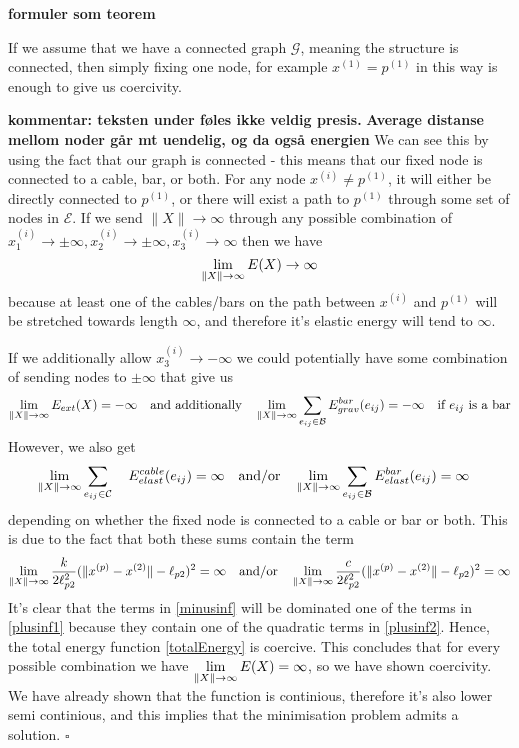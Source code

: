 \textbf{formuler som teorem}

If we assume that we have a connected graph $\mathcal{G}$, meaning the structure is connected, then simply fixing one node, for example $x^{(1)} = p^{(1)}$ in this way is enough to give us coercivity.

\textbf{kommentar: teksten under føles ikke veldig presis.}
 \textbf{Average distanse mellom noder går mt uendelig, og da også energien}
We can see this by using the fact that our graph is connected - this means that our fixed node is connected to a cable, bar, or both. For any node $x^{(i)} \neq p^{(1)}$, it will either be directly connected to $p^{(1)}$, or there will exist a path to $p^{(1)}$ through some set of nodes in $\mathcal{E}$. If we send $\lVert X \rVert \to \infty$ through any possible combination of $x^{(i)}_1 \to \pm \infty,x^{(i)}_2 \to \pm \infty,x^{(i)}_3 \to \infty$ then we have $$\lim\limits_{\rVert X \lVert \to \infty} E(X)\to \infty$$ because at least one of the cables/bars on the path between $x^{(i)}$ and $p^{(1)}$ will be stretched towards length $\infty$, and therefore it's elastic energy will tend to $\infty$. 

If we additionally allow $x^{(i)}_3 \to -\infty$ we could potentially have some combination of sending nodes to $\pm \infty$ that give us
\begin{equation}
  \lim\limits_{\rVert X \lVert \to \infty} E_{ext}(X) = -\infty
\quad\text{and additionally}\quad
\lim\limits_{\rVert X \lVert \to \infty} \sum\limits_{e_{ij} \in \mathcal{B}} E^{bar}_{grav}(e_{ij}) = -\infty \quad \text{if $e_{ij}$ is a bar}
\label{minusinf}
\end{equation} 
However, we also get
\begin{equation} 
\label{plusinf1}
\begin{aligned}
     &\lim\limits_{\rVert X \lVert \to \infty} \sum\limits_{e_{ij} \in \mathcal{C}}\quad E^{cable}_{elast}(e_{ij}) = \infty \quad \text{and/or}\quad \lim\limits_{\rVert X \lVert \to \infty} \sum\limits_{e_{ij} \in \mathcal{B }}E^{bar}_{elast}(e_{ij}) = \infty \quad\\ 
\end{aligned} 
\end{equation}
depending on whether the fixed node is connected to a cable or bar or both. This is due to the fact that both these sums contain the term \begin{equation}
 \lim\limits_{\rVert X \lVert \to \infty} \frac{k}{2 \ell_{p2}^2}(\lVert x^{(p)} - x^{(2)} \rVert-\ell_{p2})^2 = \infty \quad \text{and/or} \quad \lim\limits_{\rVert X \lVert \to \infty} \frac{c}{2 \ell_{p2}^2}(\lVert x^{(p)} - x^{(2)} \rVert-\ell_{p2})^2 = \infty
 \label{plusinf2}
\end{equation}
It's clear that the terms in \eqref{minusinf} will be dominated one of the terms in \eqref{plusinf1} because they contain one of the quadratic terms in \eqref{plusinf2}. Hence, the total energy function \eqref{totalEnergy} is coercive. This concludes that for every possible combination we have $\lim\limits_{\rVert X \lVert \to \infty} E(X) = \infty$, so we have shown coercivity. We have already shown that the function is continious, therefore it's also lower semi continious, and this implies that the minimisation problem admits a solution. $\square$

